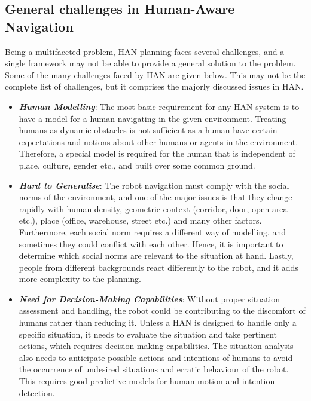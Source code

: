 \subsection{General challenges in Human-Aware Navigation}
Being a multifaceted problem, HAN planning faces several challenges, and a single framework may not be able to provide a general solution to the problem. Some of the many challenges faced by HAN are given below. This may not be the complete list of challenges, but it comprises the majorly discussed issues in HAN. 
\begin{itemize}[leftmargin=*]
    \item \textbf{\textit{Human Modelling}}: The most basic requirement for any HAN system is to have a model for a human navigating in the given environment. Treating humans as dynamic obstacles is not sufficient as a human have certain expectations and notions about other humans or agents in the environment. Therefore, a special model is required for the human that is independent of place, culture, gender etc., and built over some common ground. 
    \item\textbf{\textit{Hard to Generalise}}: The robot navigation must comply with the social norms of the environment, and one of the major issues is that they change rapidly with human density, geometric context (corridor, door, open area etc.), place (office, warehouse, street etc.) and many other factors. Furthermore, each social norm requires a different way of modelling, and sometimes they could conflict with each other. Hence, it is important to determine which social norms are relevant to the situation at hand. Lastly, people from different backgrounds react differently to the robot, and it adds more complexity to the planning.
    \item \textbf{\textit{Need for Decision-Making Capabilities}}: Without proper situation assessment and handling, the robot could be contributing to the discomfort of humans rather than reducing it. Unless a HAN is designed to handle only a specific situation, it needs to evaluate the situation and take pertinent actions, which requires decision-making capabilities. The situation analysis also needs to anticipate possible actions and intentions of humans to avoid the occurrence of undesired situations and erratic behaviour of the robot. This requires good predictive models for human motion and intention detection.

\end{itemize}
